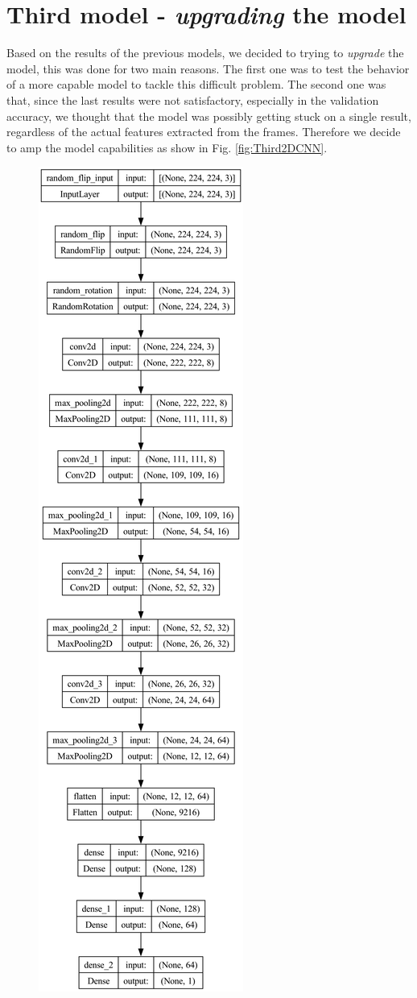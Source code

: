\section{Third model - \textit{upgrading} the model}
Based on the results of the previous models, we decided to trying to \textit{upgrade} the model, this was done for two main reasons. The first one was to test the behavior of a more capable model to tackle this difficult problem. The second one was that, since the last results were not satisfactory, especially in the validation accuracy, we thought that the model was possibly getting stuck on a single result, regardless of the actual features extracted from the frames. Therefore we decide to amp the model capabilities as show in Fig. \ref{fig:Third2DCNN}. 
\begin{figure}[]
    \centering
    \includegraphics[scale=0.125]{images/simple3augConv8_64Dense128_64nozoom.png}

\end{figure}
